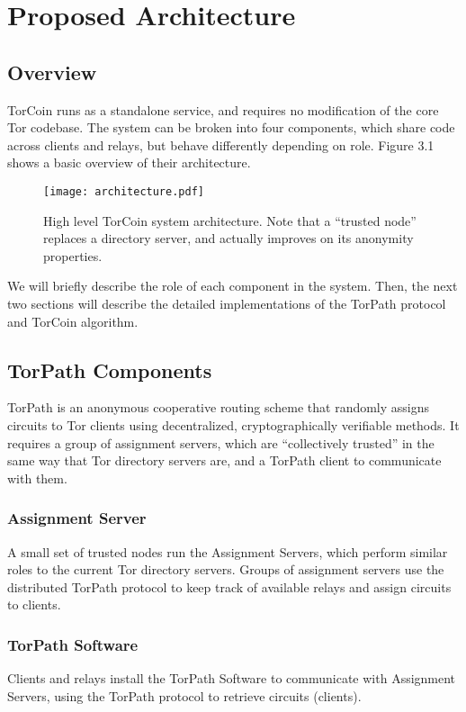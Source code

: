 \section{Proposed Architecture} \label{arch}

\subsection{Overview}

TorCoin runs as a standalone service, and requires no modification of the core
Tor codebase. The system can be broken into four components, which share code
across clients and relays, but behave differently depending on role. Figure 3.1
shows a basic overview of their architecture.

\begin{figure}
  \centering
    \texttt{[image: architecture.pdf]}
  \caption{High level TorCoin system architecture. Note that a ``trusted node''
  replaces a directory server, and actually improves on its anonymity properties.}
\end{figure}

We will briefly describe the role of each component in the system. Then, the
next two sections will describe the detailed implementations of the TorPath
protocol and TorCoin algorithm.

\subsection{TorPath Components} TorPath is an anonymous cooperative routing
scheme that randomly assigns circuits to Tor clients using decentralized,
cryptographically verifiable methods. It requires a group of assignment servers,
which are ``collectively trusted'' in the same way that Tor directory servers are, and a TorPath
client to communicate with them. 

\subsubsection{Assignment Server} A small set of trusted nodes run the
Assignment Servers, which perform similar roles to the current Tor directory 
servers. Groups of assignment servers use the distributed TorPath protocol to 
keep track of available relays and assign circuits to clients.

\subsubsection{TorPath Software} Clients and relays install the TorPath Software to
communicate with Assignment Servers, using the TorPath protocol to retrieve
circuits (clients). 

